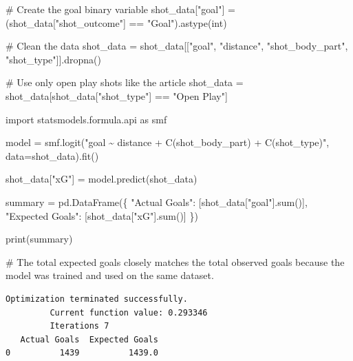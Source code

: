 \documentclass[
  11pt,
  letterpaper,
  DIV=11,
  numbers=noendperiod]{scrartcl}
\newenvironment{Shaded}{\begin{snugshade}}{\end{snugshade}}
\newcommand{\BuiltInTok}[1]{\textcolor[rgb]{0.00,0.23,0.31}{#1}}
\newcommand{\CommentTok}[1]{\textcolor[rgb]{0.37,0.37,0.37}{#1}}
\newcommand{\ImportTok}[1]{\textcolor[rgb]{0.00,0.46,0.62}{#1}}
\newcommand{\NormalTok}[1]{\textcolor[rgb]{0.00,0.23,0.31}{#1}}
\newcommand{\OperatorTok}[1]{\textcolor[rgb]{0.37,0.37,0.37}{#1}}
\newcommand{\StringTok}[1]{\textcolor[rgb]{0.13,0.47,0.30}{#1}}
\begin{document}
\begin{Shaded}
\begin{Highlighting}[]
\CommentTok{\# Create the goal binary variable }
\NormalTok{shot\_data[}\StringTok{"goal"}\NormalTok{] }\OperatorTok{=}\NormalTok{ (shot\_data[}\StringTok{"shot\_outcome"}\NormalTok{] }\OperatorTok{==} \StringTok{"Goal"}\NormalTok{).astype(}\BuiltInTok{int}\NormalTok{)}

\CommentTok{\# Clean the data}
\NormalTok{shot\_data }\OperatorTok{=}\NormalTok{ shot\_data[[}\StringTok{"goal"}\NormalTok{, }\StringTok{"distance"}\NormalTok{, }\StringTok{"shot\_body\_part"}\NormalTok{, }\StringTok{"shot\_type"}\NormalTok{]].dropna()}

\CommentTok{\# Use only open play shots like the article }
\NormalTok{shot\_data }\OperatorTok{=}\NormalTok{ shot\_data[shot\_data[}\StringTok{"shot\_type"}\NormalTok{] }\OperatorTok{==} \StringTok{"Open Play"}\NormalTok{]}
\end{Highlighting}
\end{Shaded}

\begin{Shaded}
\begin{Highlighting}[]
\ImportTok{import}\NormalTok{ statsmodels.formula.api }\ImportTok{as}\NormalTok{ smf}

\NormalTok{model }\OperatorTok{=}\NormalTok{ smf.logit(}\StringTok{"goal \textasciitilde{} distance + C(shot\_body\_part) + C(shot\_type)"}\NormalTok{, data}\OperatorTok{=}\NormalTok{shot\_data).fit()}

\NormalTok{shot\_data[}\StringTok{"xG"}\NormalTok{] }\OperatorTok{=}\NormalTok{ model.predict(shot\_data)}

\NormalTok{summary }\OperatorTok{=}\NormalTok{ pd.DataFrame(\{}
  \StringTok{"Actual Goals"}\NormalTok{: [shot\_data[}\StringTok{"goal"}\NormalTok{].}\BuiltInTok{sum}\NormalTok{()],}
  \StringTok{"Expected Goals"}\NormalTok{: [shot\_data[}\StringTok{"xG"}\NormalTok{].}\BuiltInTok{sum}\NormalTok{()]}
\NormalTok{\})}

\BuiltInTok{print}\NormalTok{(summary)}

\CommentTok{\# The total expected goals closely matches the total observed goals because the model was trained and used on the same dataset.}
\end{Highlighting}
\end{Shaded}

\begin{verbatim}
Optimization terminated successfully.
         Current function value: 0.293346
         Iterations 7
   Actual Goals  Expected Goals
0          1439          1439.0
\end{verbatim}
\end{document}
